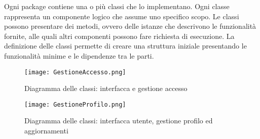 Ogni package contiene una o più classi che lo implementano.
Ogni classe rappresenta un componente logico che assume uno specifico scopo.
Le classi possono presentare dei metodi, ovvero delle istanze che descrivono le funzionalità fornite,
alle quali altri componenti possono fare richiesta di esecuzione.
La definizione delle classi permette di creare una struttura iniziale presentando le funzionalità minime e 
le dipendenze tra le parti.\\

\begin{figure}[h!]
    \begin{center}
        \texttt{[image: GestioneAccesso.png]}
        \caption{Diagramma delle classi: interfacca e gestione accesso}
    \end{center}
\end{figure}


\begin{figure}[h!]
    \begin{center}
        \texttt{[image: GestioneProfilo.png]}
        \caption{Diagramma delle classi: interfacca utente, gestione profilo ed aggiornamenti}
    \end{center}
\end{figure}
\clearpage